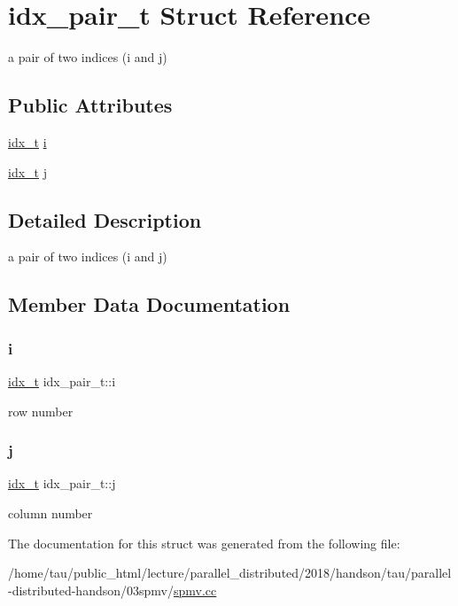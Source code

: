 \hypertarget{structidx__pair__t}{}\section{idx\+\_\+pair\+\_\+t Struct Reference}
\label{structidx__pair__t}


a pair of two indices (i and j)  


\subsection*{Public Attributes}
\begin{DoxyCompactItemize}
\item 
\hyperlink{spmv_8cc_a8e93478a00e685bea5e6a3f617bf03a3}{idx\+\_\+t} \hyperlink{structidx__pair__t_a5fc2a45497e05f6b02ae6dddd4cc5a14}{i}
\item 
\hyperlink{spmv_8cc_a8e93478a00e685bea5e6a3f617bf03a3}{idx\+\_\+t} \hyperlink{structidx__pair__t_afa260eb03684e5ae1c067c13fd33f3e0}{j}
\end{DoxyCompactItemize}


\subsection{Detailed Description}
a pair of two indices (i and j) 

\subsection{Member Data Documentation}
\mbox{\label{structidx__pair__t_a5fc2a45497e05f6b02ae6dddd4cc5a14}} 
\subsubsection{\texorpdfstring{i}{i}}
{\footnotesize\ttfamily \hyperlink{spmv_8cc_a8e93478a00e685bea5e6a3f617bf03a3}{idx\+\_\+t} idx\+\_\+pair\+\_\+t\+::i}

row number \mbox{\label{structidx__pair__t_afa260eb03684e5ae1c067c13fd33f3e0}} 
\subsubsection{\texorpdfstring{j}{j}}
{\footnotesize\ttfamily \hyperlink{spmv_8cc_a8e93478a00e685bea5e6a3f617bf03a3}{idx\+\_\+t} idx\+\_\+pair\+\_\+t\+::j}

column number 

The documentation for this struct was generated from the following file\+:\begin{DoxyCompactItemize}
\item 
/home/tau/public\+\_\+html/lecture/parallel\+\_\+distributed/2018/handson/tau/parallel-\/distributed-\/handson/03spmv/\hyperlink{spmv_8cc}{spmv.\+cc}\end{DoxyCompactItemize}
